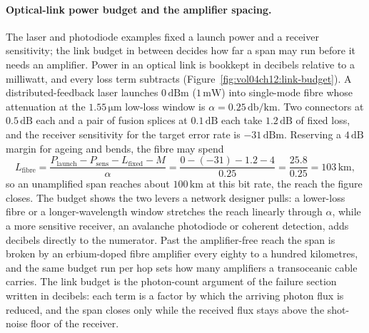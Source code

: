 \paragraph{Optical-link power budget and the amplifier spacing.}
The laser and photodiode examples fixed a launch power and a receiver
sensitivity; the link budget in between decides how far a span may run before it
needs an amplifier. Power in an optical link is bookkept in decibels relative to a
milliwatt, and every loss term subtracts (Figure~\ref{fig:vol04ch12:link-budget}).
A distributed-feedback laser launches $0\,\text{dBm}$ ($1\,\si{\milli\watt}$)
into single-mode fibre whose attenuation at the $1.55\,\si{\micro\meter}$
low-loss window is $\alpha = 0.25\,\si{\decibel\per\kilo\meter}$. Two connectors
at $0.5\,\text{dB}$ each and a pair of fusion splices at $0.1\,\text{dB}$ each
take $1.2\,\text{dB}$ of fixed loss, and the receiver sensitivity for the target
error rate is $-31\,\text{dBm}$. Reserving a $4\,\text{dB}$ margin for ageing and
bends, the fibre may spend
\[
L_{\text{fibre}} = \frac{P_{\text{launch}} - P_{\text{sens}}
  - L_{\text{fixed}} - M}{\alpha}
= \frac{0 - (-31) - 1.2 - 4}{0.25}
= \frac{25.8}{0.25}
= 103\,\si{\kilo\meter},
\]
so an unamplified span reaches about $100\,\si{\kilo\meter}$ at this bit rate,
the reach the figure closes. The budget shows the two levers a network designer
pulls: a lower-loss fibre or a longer-wavelength window stretches the reach
linearly through $\alpha$, while a more sensitive receiver, an avalanche
photodiode or coherent detection, adds decibels directly to the numerator. Past
the amplifier-free reach the span is broken by an erbium-doped fibre amplifier
every eighty to a hundred kilometres, and the same budget run per hop sets how
many amplifiers a transoceanic cable carries. The link budget is the photon-count
argument of the failure section written in decibels: each term is a factor by
which the arriving photon flux is reduced, and the span closes only while the
received flux stays above the shot-noise floor of the receiver.

